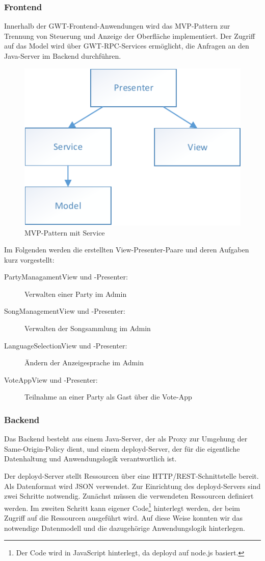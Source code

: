 \subsubsection{Frontend}
Innerhalb der GWT-Frontend-Anwendungen wird das MVP-Pattern zur Trennung von Steuerung und Anzeige
der Oberfläche implementiert. Der Zugriff auf das Model wird über GWT-RPC-Services ermöglicht, die Anfragen an den Java-Server im Backend durchführen.

\begin{figure}[tbh]
\centering
\includegraphics[width=0.6\linewidth]{Bilder/MVP-mit-Service}
\caption{MVP-Pattern mit Service}
\label{fig:MVP-mit-Service}
\end{figure}

Im Folgenden werden die erstellten View-Presenter-Paare und deren Aufgaben kurz vorgestellt:
\begin{description}
	\item[PartyManagamentView und -Presenter:] Verwalten einer Party im Admin
	\item[SongManagementView und -Presenter:] Verwalten der Songsammlung im Admin
	\item[LanguageSelectionView und -Presenter:] Ändern der Anzeigesprache im Admin
	\item[VoteAppView und -Presenter:] Teilnahme an einer Party als Gast über die Vote-App
\end{description}

\subsubsection{Backend}
Das Backend besteht aus einem Java-Server, der als Proxy zur Umgehung der Same-Origin-Policy dient, und einem deployd-Server, der für die eigentliche Datenhaltung
und Anwendungslogik verantwortlich ist.

Der deployd-Server stellt Ressourcen über eine HTTP/REST-Schnittstelle bereit. Als
Datenformat wird JSON verwendet. Zur Einrichtung des deployd-Servers sind zwei Schritte
notwendig. Zunächst müssen die verwendeten Ressourcen definiert werden. Im zweiten
Schritt kann eigener Code\footnote{Der Code wird in JavaScript hinterlegt, da deployd auf node.js basiert.} hinterlegt werden, der beim Zugriff auf die Ressourcen
ausgeführt wird. Auf diese Weise konnten wir das notwendige Datenmodell und die
dazugehörige Anwendungslogik hinterlegen.

